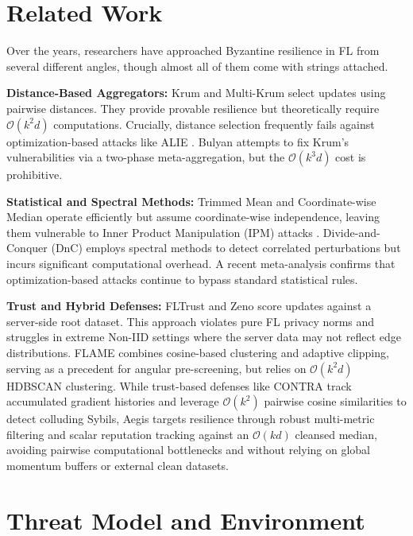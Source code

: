 \documentclass[10pt, conference]{IEEEtran}
\begin{document}
\section{Related Work}
Over the years, researchers have approached Byzantine resilience in FL from several different angles, though almost all of them come with strings attached.

\textbf{Distance-Based Aggregators:} Krum and Multi-Krum \cite{blanchard2017} select updates using pairwise distances. They provide provable resilience but theoretically require $\mathcal{O}(k^2 d)$ computations. Crucially, distance selection frequently fails against optimization-based attacks like ALIE \cite{baruch2019}. Bulyan \cite{elmhamdi2018} attempts to fix Krum's vulnerabilities via a two-phase meta-aggregation, but the $\mathcal{O}(k^3 d)$ cost is prohibitive.

\textbf{Statistical and Spectral Methods:} Trimmed Mean and Coordinate-wise Median \cite{yin2018} operate efficiently but assume coordinate-wise independence, leaving them vulnerable to Inner Product Manipulation (IPM) attacks \cite{xie2020ipm}. Divide-and-Conquer (DnC) \cite{shejwalkar2021} employs spectral methods to detect correlated perturbations but incurs significant computational overhead. A recent meta-analysis \cite{allouah2025} confirms that optimization-based attacks continue to bypass standard statistical rules.

\textbf{Trust and Hybrid Defenses:} FLTrust \cite{cao2021} and Zeno \cite{xie2019zeno} score updates against a server-side root dataset. This approach violates pure FL privacy norms and struggles in extreme Non-IID settings where the server data may not reflect edge distributions. FLAME \cite{nguyen2022} combines cosine-based clustering and adaptive clipping, serving as a precedent for angular pre-screening, but relies on $\mathcal{O}(k^2 d)$ HDBSCAN clustering. While trust-based defenses like CONTRA \cite{awan2021contra} track accumulated gradient histories and leverage $\mathcal{O}(k^2)$ pairwise cosine similarities to detect colluding Sybils, Aegis targets resilience through robust multi-metric filtering and scalar reputation tracking against an $\mathcal{O}(kd)$ cleansed median, avoiding pairwise computational bottlenecks and without relying on global momentum buffers or external clean datasets.

\section{Threat Model and Environment}
\end{document}
